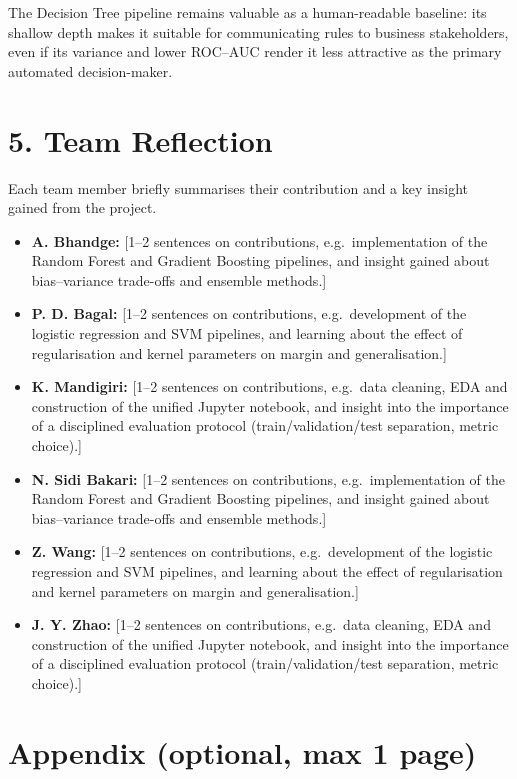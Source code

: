 \documentclass[11pt,a4paper]{article}
\begin{document}
The Decision Tree pipeline remains valuable as a human-readable baseline: its shallow depth makes it suitable for communicating rules to business stakeholders, even if its variance and lower ROC--AUC render it less attractive as the primary automated decision-maker.

\section*{5. Team Reflection}

\noindent
Each team member briefly summarises their contribution and a key insight gained from the project.

\begin{itemize}
    \item \textbf{A. Bhandge:} [1–2 sentences on contributions, e.g.\ implementation of the Random Forest and Gradient Boosting pipelines, and insight gained about bias–variance trade-offs and ensemble methods.]
    \item \textbf{P. D. Bagal:} [1–2 sentences on contributions, e.g.\ development of the logistic regression and SVM pipelines, and learning about the effect of regularisation and kernel parameters on margin and generalisation.]
    \item \textbf{K. Mandigiri:} [1–2 sentences on contributions, e.g.\ data cleaning, EDA and construction of the unified Jupyter notebook, and insight into the importance of a disciplined evaluation protocol (train/validation/test separation, metric choice).]
    \item \textbf{N. Sidi Bakari:} [1–2 sentences on contributions, e.g.\ implementation of the Random Forest and Gradient Boosting pipelines, and insight gained about bias–variance trade-offs and ensemble methods.]
    \item \textbf{Z. Wang:} [1–2 sentences on contributions, e.g.\ development of the logistic regression and SVM pipelines, and learning about the effect of regularisation and kernel parameters on margin and generalisation.]
    \item \textbf{J. Y. Zhao:} [1–2 sentences on contributions, e.g.\ data cleaning, EDA and construction of the unified Jupyter notebook, and insight into the importance of a disciplined evaluation protocol (train/validation/test separation, metric choice).]
\end{itemize}

\section*{Appendix (optional, max 1 page)}
\end{document}
